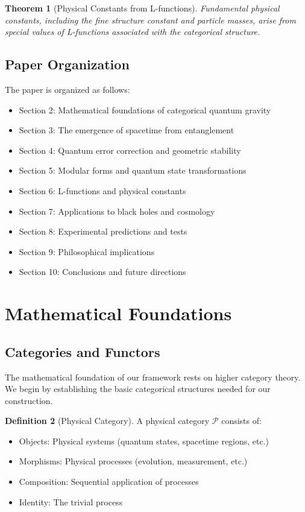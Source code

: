 \documentclass[12pt,a4paper]{article}
\newcommand{\phys}{\mathcal{P}}
\theoremstyle{plain}
\newtheorem{theorem}{Theorem}[section]
\theoremstyle{definition}
\newtheorem{definition}[theorem]{Definition}
\theoremstyle{remark}
\begin{document}
\begin{theorem}[Physical Constants from L-functions]
Fundamental physical constants, including the fine structure constant and particle masses, arise from special values of L-functions associated with the categorical structure.
\end{theorem}

\subsection{Paper Organization}

The paper is organized as follows:

\begin{itemize}
\item Section 2: Mathematical foundations of categorical quantum gravity
\item Section 3: The emergence of spacetime from entanglement
\item Section 4: Quantum error correction and geometric stability
\item Section 5: Modular forms and quantum state transformations
\item Section 6: L-functions and physical constants
\item Section 7: Applications to black holes and cosmology
\item Section 8: Experimental predictions and tests
\item Section 9: Philosophical implications
\item Section 10: Conclusions and future directions
\end{itemize}

\section{Mathematical Foundations}

\subsection{Categories and Functors}

The mathematical foundation of our framework rests on higher category theory. We begin by establishing the basic categorical structures needed for our construction.

\begin{definition}[Physical Category]
A physical category $\phys$ consists of:
\begin{itemize}
\item Objects: Physical systems (quantum states, spacetime regions, etc.)
\item Morphisms: Physical processes (evolution, measurement, etc.)
\item Composition: Sequential application of processes
\item Identity: The trivial process
\end{itemize}
\end{definition}
\end{document}
